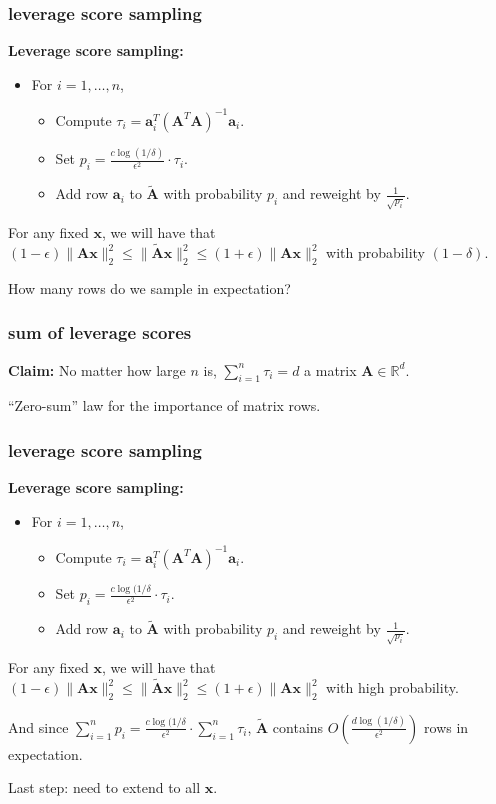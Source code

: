\documentclass[compress]{beamer}
\newcommand{\bv}[1]{\mathbf{#1}}
\newcommand{\R}{\mathbb{R}}
\begin{document}
\begin{frame}[t]
	\frametitle{leverage score sampling}
	\textbf{Leverage score sampling:}
	\begin{itemize}
		\item For $i = 1, \ldots, n$, 
		\begin{itemize}
			\item Compute $\tau_i = \bv{a}_i^T(\bv{A}^T\bv{A})^{-1}\bv{a}_i$. 
			\item Set $p_i = \frac{c\log(1/\delta)}{\epsilon^2}\cdot \tau_i$.
			\item Add row $\bv{a}_i$ to $\tilde{\bv{A}}$ with probability $p_i$ and reweight by $\frac{1}{\sqrt{p_i}}$.  			
		\end{itemize}
	\end{itemize}
	For any fixed $\bv{x}$, we will have that $(1-\epsilon) \|{\bv{A}}\bv{x}\|_2^2\leq \|\tilde{\bv{A}}\bv{x}\|_2^2 \leq (1+\epsilon) \|{\bv{A}}\bv{x}\|_2^2$ with probability $(1-\delta)$. 
	
	\begin{center}
	\alert{How many rows do we sample in expectation?}
	\end{center}
\end{frame}

\begin{frame}[t]
	\frametitle{sum of leverage scores}
	\textbf{Claim:} No matter how large $n$ is, $\sum_{i=1}^n \tau_i = d$ a matrix $\bv{A}\in \R^d$. 
	
	
	\vspace{12em}
	\begin{center}
		\alert{``Zero-sum'' law for the importance of matrix rows.}
	\end{center}
\end{frame}

\begin{frame}[t]
	\frametitle{leverage score sampling}
		\textbf{Leverage score sampling:}
	\begin{itemize}
		\item For $i = 1, \ldots, n$, 
		\begin{itemize}
			\item Compute $\tau_i = \bv{a}_i^T(\bv{A}^T\bv{A})^{-1}\bv{a}_i$. 
			\item Set $p_i = \frac{c\log(1/\delta}{\epsilon^2}\cdot \tau_i$.
			\item Add row $\bv{a}_i$ to $\tilde{\bv{A}}$ with probability $p_i$ and reweight by $\frac{1}{\sqrt{p_i}}$.  			
		\end{itemize}
	\end{itemize}
	For any fixed $\bv{x}$, we will have that $(1-\epsilon) \|{\bv{A}}\bv{x}\|_2^2\leq \|\tilde{\bv{A}}\bv{x}\|_2^2 \leq (1+\epsilon) \|{\bv{A}}\bv{x}\|_2^2$ with high probability. 
	
	And since $\sum_{i=1}^n p_i = \frac{c\log(1/\delta}{\epsilon^2}\cdot \sum_{i=1}^n \tau_i$,  $\tilde{\bv{A}}$ contains $O\left(\frac{d\log(1/\delta)}{\epsilon^2}\right)$ rows in expectation.

\begin{center}
	Last step: need to extend to all $\bv{x}$. 	
\end{center}
\end{frame}
\end{document}
